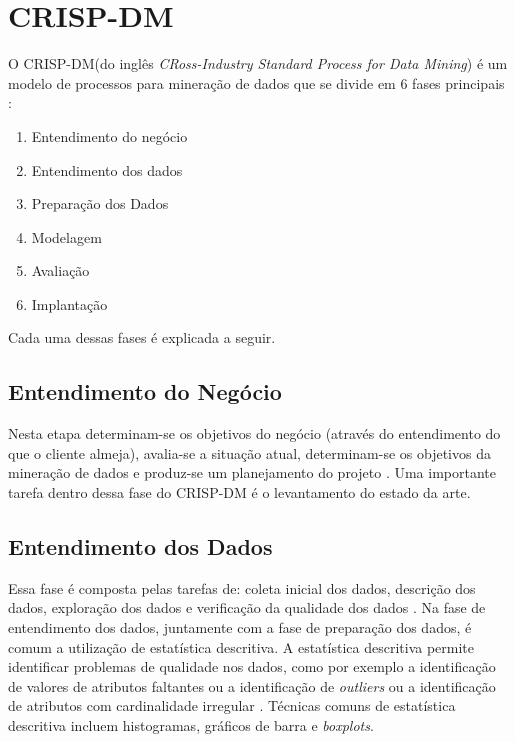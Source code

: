 \section{CRISP-DM}
O \acrshort{CRISP-DM}(do inglês \textit{CRoss-Industry Standard Process for Data Mining}) é um
modelo de processos para mineração de dados que se divide em 6 fases principais
\cite{crispdm}:
\begin{enumerate}
    \item Entendimento do negócio
    \item Entendimento dos dados
    \item Preparação dos Dados
    \item Modelagem
    \item Avaliação
    \item Implantação
\end{enumerate}
Cada uma dessas fases é explicada a seguir.

\subsection{Entendimento do Negócio}
Nesta etapa determinam-se os objetivos do negócio (através do entendimento do que o cliente
almeja), avalia-se a situação atual, determinam-se os objetivos da mineração de dados
e produz-se um planejamento do projeto \cite{crispdm}. Uma importante tarefa dentro
dessa fase do CRISP-DM é o levantamento do estado da arte. 

\subsection{Entendimento dos Dados}
Essa fase é composta pelas tarefas de: coleta inicial dos dados, descrição dos dados,
exploração dos dados e verificação da qualidade dos dados \cite{crispdm}.
Na fase de entendimento dos dados, juntamente com a fase de preparação dos dados, 
é comum a utilização de estatística descritiva. A
estatística descritiva permite identificar problemas de qualidade nos dados, como por
exemplo a identificação de valores de atributos faltantes ou a identificação de
\textit{outliers} ou a identificação de atributos com cardinalidade irregular
\cite{ml_book}. Técnicas comuns de estatística descritiva incluem histogramas,
gráficos de barra e \textit{boxplots}. 

